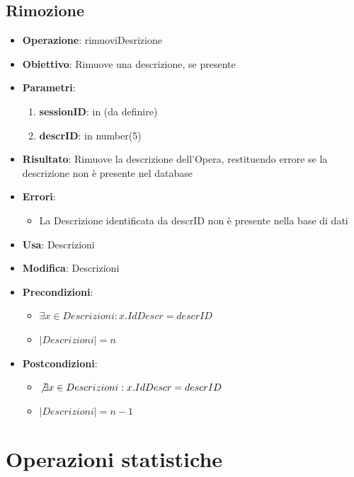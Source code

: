 \documentclass[a4paper,11pt]{article}
\begin{document}
\subsection{Rimozione}
\begin{itemize}
	\item \textbf{Operazione}: rimuoviDesrizione
	\item \textbf{Obiettivo}: Rimuove una descrizione, se presente
	\item \textbf{Parametri}:
	\begin{enumerate}
		\item \textbf{sessionID}: in (da definire)
		\item \textbf{descrID}: in number(5)
	\end{enumerate}
	\item \textbf{Risultato}: Rimuove la descrizione dell'Opera, restituendo errore se la descrizione non è presente nel database
	\item \textbf{Errori}: 
	\begin{itemize}
		\item La Descrizione identificata da descrID non è presente nella base di dati
	\end{itemize}
	\item \textbf{Usa}: Descrizioni
	\item \textbf{Modifica}: Descrizioni
	\item \textbf{Precondizioni}:
	\begin{itemize}
		\item $\exists x \in Descrizioni : x.IdDescr = descrID$
		\item $|Descrizioni| = n$
	\end{itemize}
	\item \textbf{Postcondizioni}:
	\begin{itemize}
		\item $\not\exists x \in Descrizioni : x.IdDescr = descrID$
		\item $|Descrizioni| = n - 1$
	\end{itemize}
\end{itemize}

\section{Operazioni statistiche}
\end{document}
